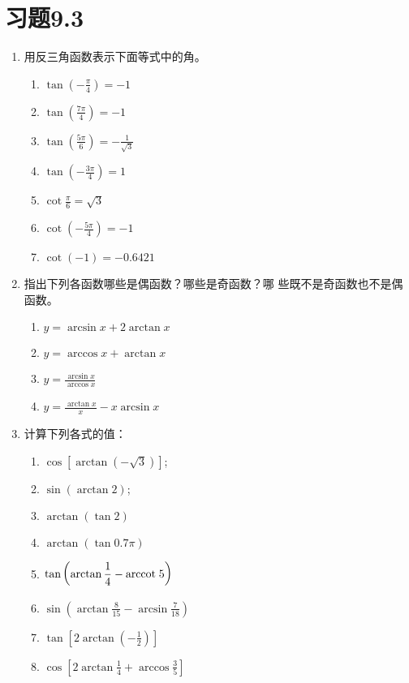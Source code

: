 \section*{习题9.3}
\begin{enumerate}
    \item 用反三角函数表示下面等式中的角。
\begin{multicols}{2}
\begin{enumerate}
    \item $\tan\left(-\frac{\pi}{4}\right)=-1$
    \item $\tan\left(\frac{7\pi}{4}\right)=-1$
    \item $\tan\left(\frac{5\pi}{6}\right)=-\frac{1}{\sqrt{3}}$
    \item $\tan\left(-\frac{3\pi}{4}\right)=1$
    \item $\cot\frac{\pi}{6}=\sqrt{3}$
    \item $\cot\left(-\frac{5\pi}{4}\right)=-1$
    \item $\cot\left(-1\right)=-0.6421$
\end{enumerate}
\end{multicols}

\item 指出下列各函数哪些是偶函数？哪些是奇函数？哪
些既不是奇函数也不是偶函数。
\begin{multicols}{2}
    \begin{enumerate}
    \item $y=\arcsin x+2 \arctan x$
    \item $y=\arccos x+\arctan x$
    \item $y=\frac{\arcsin x}{\arccos x}$
    \item $y=\frac{\arctan x}{x}-x \arcsin x$
    \end{enumerate}
    \end{multicols}

    \item 计算下列各式的值：
\begin{multicols}{2}
\begin{enumerate}
\item  $\cos [\arctan(-\sqrt{3})]$;
\item  $\sin (\arctan 2)$;
\item $\arctan(\tan2)$
\item  $\arctan(\tan0.7 \pi)$
\item $\tan\left(\arctan \dfrac{1}{4}-{\rm arccot\; }  5\right)$
\item $\sin \left(\arctan \frac{8}{15}-\arcsin \frac{7}{18}\right)$
\item $\tan\left[2 \arctan\left(-\frac{1}{2}\right)\right]$
\item $\cos \left[2 \arctan \frac{1}{4}+\arccos \frac{3}{5}\right]$
\end{enumerate}
\end{multicols}


\end{enumerate}
